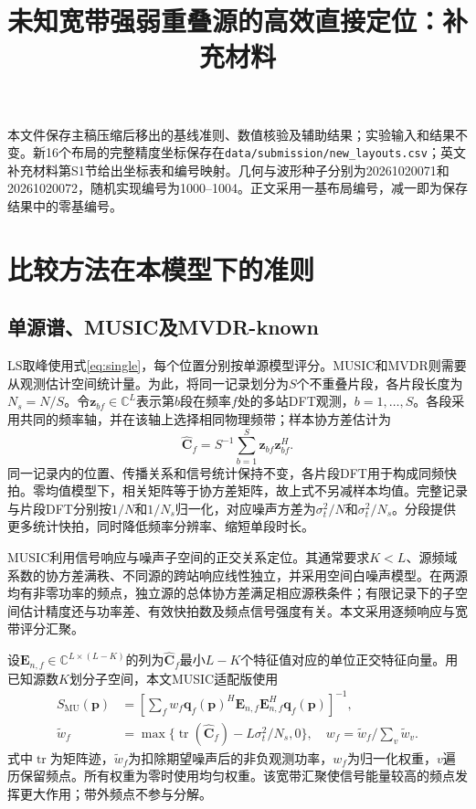\documentclass[a4paper]{cas-sc}
\numberwithin{equation}{section}
\numberwithin{figure}{section}
\numberwithin{table}{section}
\newcommand{\C}{\mathbb C}
\newcommand{\tr}{\operatorname{tr}}
\begin{document}
\let\WriteBookmarks\relax
{}
\shortauthors{}
\title[mode=title]{未知宽带强弱重叠源的高效直接定位：补充材料}
\maketitle
\renewcommand{\thesection}{S\arabic{section}}
本文件保存主稿压缩后移出的基线准则、数值核验及辅助结果；实验输入和结果不变。新16个布局的完整精度坐标保存在\texttt{data/submission/new\_layouts.csv}；英文补充材料第S1节给出坐标表和编号映射。几何与波形种子分别为20261020071和20261020072，随机实现编号为1000--1004。正文采用一基布局编号，减一即为保存结果中的零基编号。


\section{比较方法在本模型下的准则}\label{app:baselines}
\subsection{单源谱、MUSIC及MVDR-known}
LS取峰使用式\eqref{eq:single}，每个位置分别按单源模型评分。MUSIC和MVDR则需要从观测估计空间统计量。为此，将同一记录划分为$S$个不重叠片段，各片段长度为$N_s=N/S$。令$\bm z_{bf}\in\C^L$表示第$b$段在频率$f$处的多站DFT观测，$b=1,\ldots,S$。各段采用共同的频率轴，并在该轴上选择相同物理频带；样本协方差估计为
\begin{equation}
 \widehat{\bm C}_f=S^{-1}\sum_{b=1}^S\bm z_{bf}\bm z_{bf}^H .
\end{equation}
同一记录内的位置、传播关系和信号统计保持不变，各片段DFT用于构成同频快拍。零均值模型下，相关矩阵等于协方差矩阵，故上式不另减样本均值。完整记录与片段DFT分别按$1/N$和$1/N_s$归一化，对应噪声方差为$\sigma_t^2/N$和$\sigma_t^2/N_s$。分段提供更多统计快拍，同时降低频率分辨率、缩短单段时长。

MUSIC利用信号响应与噪声子空间的正交关系定位\cite{WeissAmar2005}。其通常要求$K<L$、源频域系数的协方差满秩、不同源的跨站响应线性独立，并采用空间白噪声模型。在两源均有非零功率的频点，独立源的总体协方差满足相应源秩条件；有限记录下的子空间估计精度还与功率差、有效快拍数及频点信号强度有关。本文采用逐频响应与宽带评分汇聚。

设$\bm E_{n,f}\in\C^{L\times(L-K)}$的列为$\widehat{\bm C}_f$最小$L-K$个特征值对应的单位正交特征向量。用已知源数$K$划分子空间，本文MUSIC适配版使用
\begin{align}
 S_{\mathrm{MU}}(\bm p)&=\left[\sum_f w_f
 \bm q_f(\bm p)^H\bm E_{n,f}\bm E_{n,f}^H\bm q_f(\bm p)\right]^{-1},\label{eq:music}\\
 \widetilde w_f&=\max\{\tr(\widehat{\bm C}_f)-L\sigma_t^2/N_s,0\},\quad
 w_f=\widetilde w_f/\sum_v\widetilde w_v .\nonumber
\end{align}
式中$\tr$为矩阵迹，$\widetilde w_f$为扣除期望噪声后的非负观测功率，$w_f$为归一化权重，$v$遍历保留频点。所有权重为零时使用均匀权重。该宽带汇聚使信号能量较高的频点发挥更大作用；带外频点不参与分解。
\end{document}
